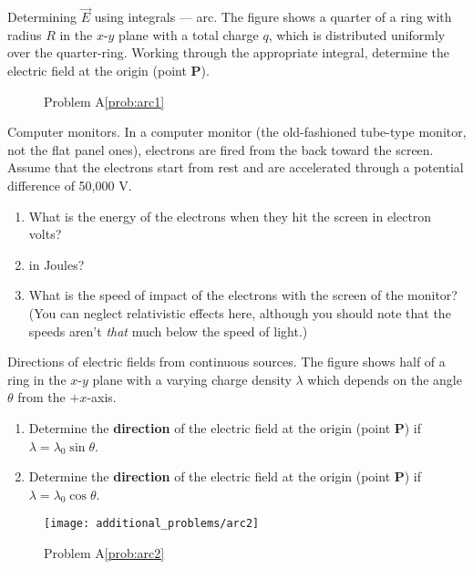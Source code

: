 \begin{aproblem}{Determining $\vec{E}$ using integrals --- arc.}  
  The figure shows a quarter of a ring with radius $R$ in the $x$-$y$
  plane with a total charge $q$, which is distributed uniformly over
  the quarter-ring. Working through the appropriate integral,
  determine the electric field at the origin (point {\bf P}).
  \label{prob:arc1}

  \begin{figure}[h]
    \begin{center}
      \caption{Problem A\ref{prob:arc1}}
    \end{center}
  \end{figure}
\end{aproblem}

\newpage

\begin{aproblem}{Computer monitors.} 
  In a computer monitor (the old-fashioned tube-type monitor, not the
  flat panel ones), electrons are fired from the back toward the
  screen.  Assume that the electrons start from rest and are
  accelerated through a potential difference of 50,000 V.
   \begin{enumerate}
   \item What is the energy of the electrons when they hit the screen
     in electron volts?
   \item in Joules?  
   \item What is the speed of impact of the electrons with the screen
     of the monitor?  (You can neglect relativistic effects here,
     although you should note that the speeds aren't {\it that} much
     below the speed of light.)
   \end{enumerate}
   \label{prob:ComputerMonitors}
\end{aproblem}

\begin{aproblem}{Directions of electric fields from continuous sources.}
  The figure shows half of a ring in the $x$-$y$ plane with a varying
  charge density $\lambda$ which depends on the angle $\theta$ from
  the $+x$-axis.
  \begin{enumerate}
  \item Determine the {\bf direction} of the electric field at the
    origin (point {\bf P}) if $\lambda = \lambda_0 \sin{\theta}$.
  \item Determine the {\bf direction} of the electric field at the
    origin (point {\bf P}) if $\lambda = \lambda_0 \cos{\theta}$.
  \end{enumerate}
  \label{prob:arc2}
  \begin{figure}[h]
    \begin{center}
      \texttt{[image: additional\_problems/arc2]}
      \caption{Problem A\ref{prob:arc2}}
    \end{center}
  \end{figure}
\end{aproblem}


